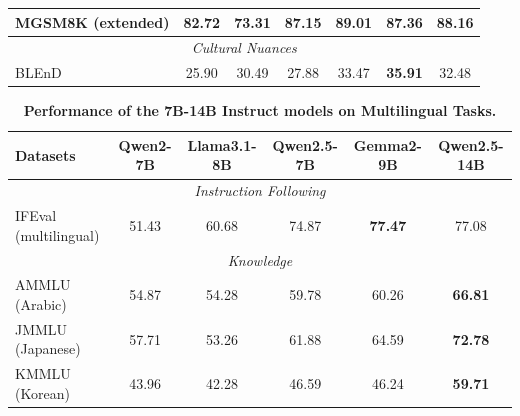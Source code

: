 \begin{table}[t]
\begin{tabular}{@{}lcccccc@{}}
\midrule

MGSM8K (extended) & 82.72 & 73.31 & 87.15 & \textbf{89.01} & 87.36 & 88.16 \\

\midrule

\multicolumn{7}{c}{\textit{Cultural Nuances}} \\

\midrule

BLEnD & 25.90 & 30.49 & 27.88 & 33.47 & \textbf{35.91} & 32.48 \\

\bottomrule

\end{tabular}

\end{table}


\begin{table}[t]

\centering

\caption{\textbf{Performance of the 7B-14B Instruct models on Multilingual Tasks.}}

\label{tab:eval_multilingual_14B}
\small
\setlength{\tabcolsep}{2.6pt}

\begin{tabular}{@{}lccccc@{}}

\toprule

\textbf{Datasets} & \textbf{Qwen2-7B} & \textbf{Llama3.1-8B} & \textbf{Qwen2.5-7B} & \textbf{Gemma2-9B} & \textbf{Qwen2.5-14B} \\

\midrule

\multicolumn{6}{c}{\textit{Instruction Following}} \\

\midrule

IFEval (multilingual) & 51.43 & 60.68 & 74.87 & \textbf{77.47} & 77.08 \\

\midrule

\multicolumn{6}{c}{\textit{Knowledge}} \\

\midrule

AMMLU (Arabic) & 54.87 & 54.28 & 59.78 & 60.26 & \textbf{66.81} \\

JMMLU (Japanese) & 57.71 & 53.26 & 61.88 & 64.59 & \textbf{72.78} \\

KMMLU (Korean) & 43.96 & 42.28 & 46.59 & 46.24 & \textbf{59.71} \\


\end{tabular}
\end{table}
